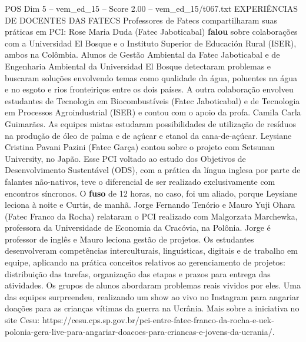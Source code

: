 \begin{textsample}{POS Dim 5 – vem\_ed\_15 – Score 2.00 – vem\_ed\_15/t067.txt}  \label{ex:f5_pos_122}
EXPERIÊNCIAS DE DOCENTES DAS FATECS Professores de Fatecs compartilharam suas práticas em PCI: Rose Maria Duda (Fatec Jaboticabal) \textbf{falou} sobre colaborações com a Universidad El Bosque e o Instituto Superior de Educación Rural (ISER), ambos na Colômbia.
Alunos de Gestão Ambiental da Fatec Jaboticabal e de Engenharia Ambiental da Universidad El Bosque detectaram problemas e buscaram soluções envolvendo temas como qualidade da água, poluentes na água e no esgoto e rios fronteiriços entre os dois países.
A outra colaboração envolveu estudantes de Tecnologia em Biocombustíveis (Fatec Jaboticabal) e de Tecnologia em Processos Agroindustrial (ISER) e contou com o apoio da profa.
Camila Carla Guimarães.
As equipes mistas estudaram possibilidades de utilização de resíduos na produção de óleo de palma e de açúcar e etanol da cana-de-açúcar.
Leysiane Cristina Pavani Pazini (Fatec Garça) contou sobre o projeto com Setsunan University, no Japão.
Esse PCI voltado ao estudo dos Objetivos de Desenvolvimento Sustentável (ODS), com a prática da língua inglesa por parte de falantes não-nativos, teve o diferencial de ser realizado exclusivamente com encontros síncronos.
O \textbf{fuso} de 12 horas, no caso, foi um aliado, porque Leysiane leciona à noite e Curtis, de manhã.
Jorge Fernando Tenório e Mauro Yuji Ohara (Fatec Franco da Rocha) relataram o PCI realizado com Malgorzata Marchewka, professora da Universidade de Economia da Cracóvia, na Polônia.
Jorge é professor de inglês e Mauro leciona gestão de projetos.
Os estudantes desenvolveram competências interculturais, linguísticas, digitais e de trabalho em equipe, aplicando na prática conceitos relativos ao gerenciamento de projetos: distribuição das tarefas, organização das etapas e prazos para entrega das atividades.
Os grupos de alunos abordaram problemas reais vividos por eles.
Uma das equipes surpreendeu, realizando um show ao vivo no Instagram para angariar doações para as crianças vítimas da guerra na Ucrânia.
Mais sobre a iniciativa no site Cesu: https://cesu.cps.sp.gov.br/pci-entre-fatec-franco-da-rocha-e-uek-polonia-gera-live-para-angariar-doacoes-para-criancas-e-jovens-da-ucrania/.

\end{textsample}

